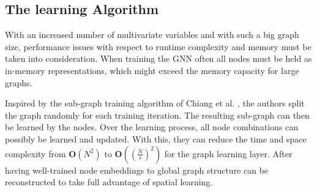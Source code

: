 \documentclass[letterpaper,twocolumn,12pt]{article}
\begin{document}
    \subsection{The learning Algorithm}
    With an increased number of multivariate variables and with such a big graph size,
    performance issues with respect to runtime complexity and memory must be taken into consideration.
    When training the GNN often all nodes must be held as in-memory representations, which might exceed the memory capacity for large graphs.

    Inspired by the sub-graph training algorithm of Chiang et al. \cite{chiang2019cluster}, the authors split the graph
    randomly for each training iteration.
    The resulting sub-graph can then be learned by the nodes.
    Over the learning process, all node combinations can possibly be learned and updated.
    With this, they can reduce the time and space complexity from $\mathbf{O}(N^2)$ to $\mathbf{O}\left((\frac{N}{s})^2\right)$ for the graph learning layer.
    After having well-trained node embeddings to global graph structure can be reconstructed to take full advantage of spatial learning.
\end{document}
